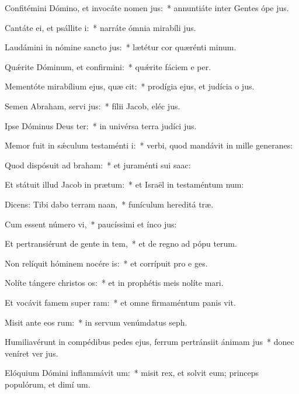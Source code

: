 \item Confitémini Dómino, et invocáte nomen jus:~* annuntiáte inter Gentes ópe jus.
\item Cantáte ei, et psállite i:~* narráte ómnia mirabíli jus.
\item Laudámini in nómine sancto jus:~* lætétur cor quærénti minum.
\item Quǽrite Dóminum, et confirmini:~* quǽrite fáciem e per.
\item Mementóte mirabílium ejus, quæ cit:~* prodígia ejus, et judícia o jus.
\item Semen Abraham, servi jus:~* fílii Jacob, eléc jus.
\item Ipse Dóminus Deus ter:~* in univérsa terra judíci jus.
\item Memor fuit in sǽculum testaménti i:~* verbi, quod mandávit in mille generanes:
\item Quod dispósuit ad braham:~* et juraménti sui  saac:
\item Et státuit illud Jacob in prætum:~* et Israël in testaméntum num:
\item Dicens: Tibi dabo terram naan,~* funículum hereditá træ.
\item Cum essent número vi,~* paucíssimi et ínco jus:
\item Et pertransiérunt de gente in tem,~* et de regno ad pópu terum.
\item Non relíquit hóminem nocére is:~* et corrípuit pro e ges.
\item Nolíte tángere christos os:~* et in prophétis meis nolíte mari.
\item Et vocávit famem super ram:~* et omne firmaméntum panis vit.
\item Misit ante eos rum:~* in servum venúmdatus  seph.
\item Humiliavérunt in compédibus pedes ejus, ferrum pertránsiit ánimam jus~* donec veníret ver jus.
\item Elóquium Dómini inflammávit um:~* misit rex, et solvit eum; princeps populórum, et dimí um.
